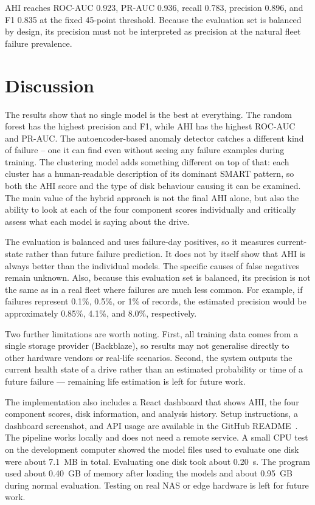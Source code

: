 \documentclass[sigconf,natbib=false]{acmart}
\begin{document}
AHI reaches ROC-AUC 0.923, PR-AUC 0.936, recall 0.783, precision 0.896, and F1 0.835 at the fixed 45-point threshold. Because the evaluation set is balanced by design, its precision must not be interpreted as precision at the natural fleet failure prevalence.

\section{Discussion}
\label{sec:discussion}

The results show that no single model is the best at everything. The random forest has the highest precision and F1, while AHI has the highest ROC-AUC and PR-AUC. The autoencoder-based anomaly detector catches a different kind of failure -- one it can find even without seeing any failure examples during training. The clustering model adds something different on top of that: each cluster has a human-readable description of its dominant SMART pattern, so both the AHI score and the type of disk behaviour causing it can be examined. The main value of the hybrid approach is not the final AHI alone, but also the ability to look at each of the four component scores individually and critically assess what each model is saying about the drive.

The evaluation is balanced and uses failure-day positives, so it measures current-state rather than future failure prediction. It does not by itself show that AHI is always better than the individual models. The specific causes of false negatives remain unknown. Also, because this evaluation set is balanced, its precision is not the same as in a real fleet where failures are much less common. For example, if failures represent 0.1\%, 0.5\%, or 1\% of records, the estimated precision would be approximately 0.85\%, 4.1\%, and 8.0\%, respectively.

Two further limitations are worth noting. First, all training data comes from a single storage provider (Backblaze), so results may not generalise directly to other hardware vendors or real-life scenarios. Second, the system outputs the current health state of a drive rather than an estimated probability or time of a future failure — remaining life estimation is left for future work.

The implementation also includes a React dashboard that shows AHI, the four component scores, disk information, and analysis history. Setup instructions, a dashboard screenshot, and API usage are available in the GitHub README~\cite{petek2026github}. The pipeline works locally and does not need a remote service. A small CPU test on the development computer showed the model files used to evaluate one disk were about 7.1~MB in total. Evaluating one disk took about 0.20~s. The program used about 0.40~GB of memory after loading the models and about 0.95~GB during normal evaluation. Testing on real NAS or edge hardware is left for future work.
\end{document}
